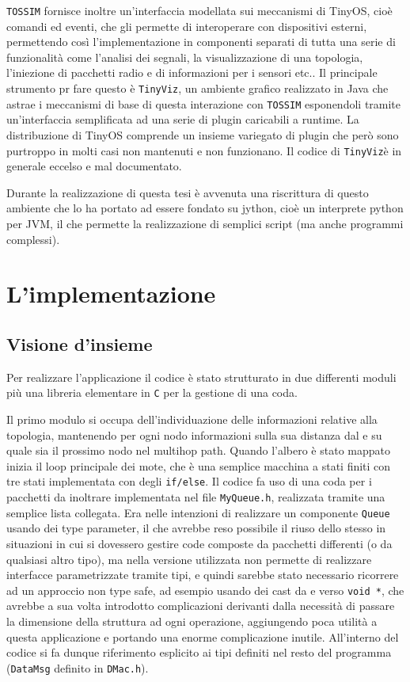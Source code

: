 \documentclass[twoside,11pt,a4paper,italian,openany]{book}
\newcommand{\tv}{\texttt{TinyViz}}
\newcommand{\tos}{\texttt{TOSSIM} }
\begin{document}
\tos fornisce inoltre un'interfaccia modellata sui meccanismi di TinyOS, cioè comandi ed eventi, 
che gli permette di interoperare con dispositivi esterni, permettendo così l'implementazione 
in componenti separati di tutta una serie di funzionalità come l'analisi dei segnali, 
la visualizzazione di una topologia, l'iniezione di pacchetti radio e di informazioni per 
i sensori etc.. 
Il principale strumento pr fare questo è \tv, un ambiente grafico realizzato in Java che 
astrae i meccanismi di base di questa 
interazione con \tos esponendoli tramite un'interfaccia semplificata ad una serie 
di plugin caricabili a runtime.  
La distribuzione di TinyOS comprende un insieme variegato di plugin che 
però sono purtroppo in molti casi non mantenuti e non funzionano. Il codice di \tv è 
in generale eccelso e mal documentato. 

Durante la realizzazione di questa tesi è avvenuta una riscrittura di 
questo ambiente che lo ha portato ad essere fondato su jython\cite{tython}, 
cioè un interprete python per JVM, il che permette la realizzazione di semplici script 
(ma anche programmi complessi).  
 

\chapter{L'implementazione}
\section{Visione d'insieme}
Per realizzare l'applicazione il codice è stato strutturato in due differenti moduli più 
una libreria elementare in \texttt{C} per la gestione di una coda.

Il primo modulo si occupa dell'individuazione delle informazioni relative alla topologia, 
mantenendo per ogni nodo informazioni sulla sua distanza dal \sink e su quale sia il prossimo 
nodo nel multihop path.  
Quando l'albero è stato mappato inizia il loop principale dei mote, che è una 
semplice macchina a stati finiti con tre stati implementata con degli \texttt{if/else}.
Il codice fa uso di una coda per i pacchetti da inoltrare implementata nel file \texttt{MyQueue.h}, realizzata tramite una semplice lista collegata.
Era nelle intenzioni di realizzare un componente \texttt{Queue} usando dei type parameter, 
il che avrebbe reso possibile il riuso dello stesso in situazioni in cui si dovessero gestire 
code composte da pacchetti differenti (o da qualsiasi altro tipo), ma \nesc nella versione 
utilizzata non permette di 
realizzare interfacce parametrizzate tramite tipi, e quindi sarebbe stato necessario ricorrere 
ad un approccio non type safe, ad esempio usando dei cast da e verso \texttt{void *}, che  
avrebbe a sua volta introdotto complicazioni derivanti dalla necessità di passare la dimensione 
della struttura ad ogni operazione, aggiungendo poca utilità a questa applicazione e portando  
una enorme complicazione inutile.
All'interno del codice si fa dunque riferimento esplicito ai tipi 
definiti nel resto del programma (\texttt{DataMsg} definito in \texttt{DMac.h}).
\end{document}
